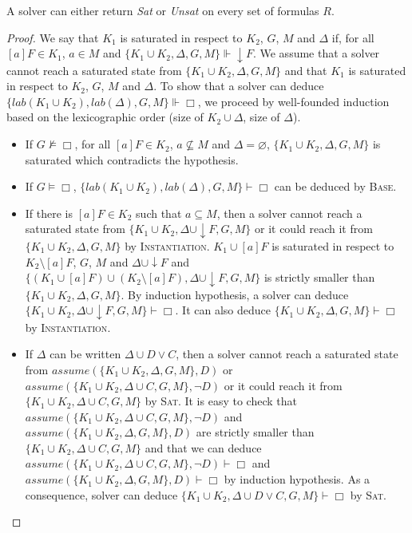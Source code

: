 \documentclass[a4paper,11pt]{article}
\newcommand{\T}{\mathit{lab}}
\newcommand{\A}{\mathit{assume}}
\begin{document}
{\theorem\label{comp} A solver can either return \emph{Sat} or \emph{Unsat} on every set of formulas $R$.}
\begin{proof}
We say that $K_1$ is saturated in respect to $K_2$, $G$, $M$ and $\Delta$ if, for all $[a]F\in K_1$,
$a\in M$ and $\{K_1\cup K_2,\Delta,G,M\}\Vdash\downarrow F$.
We assume that a solver cannot reach a saturated state from
$\{K_1\cup K_2,\Delta,G,M\}$ and that $K_1$ is saturated in respect to $K_2$, $G$, $M$ and $\Delta$.
To show that a solver can deduce $\{\T(K_1\cup K_2),\T(\Delta),G,M\}\Vdash\Box$,
we proceed by well-founded induction based on the lexicographic order (size of $K_2\cup \Delta$,
size of $\Delta$).
\begin{itemize}
 \item If $G\nvDash\Box$, for all $[a]F\in K_2$, $a\nsubseteq M$ and $\Delta=\varnothing$,
$\{K_1\cup K_2,\Delta,G,M\}$ is saturated which contradicts the hypothesis.
 \item If $G\vDash\Box$, $\{\T(K_1\cup K_2),\T(\Delta),G,M\}\vdash\Box$ can be deduced by \textsc{Base}.
 \item If there is $[a]F\in K_2$ such that $a\subseteq M$, then a solver
cannot reach a saturated state from $\{K_1\cup K_2,\Delta\cup\downarrow F,G,M\}$ or it could
reach it from $\{K_1\cup K_2,\Delta,G,M\}$ by \textsc{Instantiation}.
$K_1\cup [a]F$ is saturated in respect to $K_2\setminus[a]F$, $G$, $M$ and $\Delta\cup\downarrow F$
and $\{(K_1\cup [a]F)\cup(K_2\setminus[a]F),\Delta\cup\downarrow F,G,M\}$ is strictly smaller than
$\{K_1\cup K_2,\Delta,G,M\}$. By induction hypothesis,
a solver can deduce $\{K_1\cup K_2,\Delta\cup\downarrow F,G,M\}\vdash\Box$.
It can also deduce $\{K_1\cup K_2,\Delta,G,M\}\vdash\Box$ by \textsc{Instantiation}.
 \item If $\Delta$ can be written $\Delta\cup D\vee C$, then a solver
cannot reach a saturated state from $\A(\{K_1\cup K_2,\Delta,G,M\},D)$ or
$\A(\{K_1\cup K_2,\Delta\cup C,G,M\},\neg D)$ or it could
reach it from $\{K_1\cup K_2,\Delta\cup C,G,M\}$ by \textsc{Sat}.
It is easy to check that $\A(\{K_1\cup K_2,\Delta\cup C,G,M\},\neg D)$ and
$\A(\{K_1\cup K_2,\Delta,G,M\},D)$ are strictly smaller than $\{K_1\cup K_2,\Delta\cup C,G,M\}$
and that we can deduce $\A(\{K_1\cup K_2,\Delta\cup C,G,M\},\neg D)\vdash\Box$ and
$\A(\{K_1\cup K_2,\Delta,G,M\},D)\vdash\Box$ by induction hypothesis.
As a consequence, solver can deduce $\{K_1\cup K_2,\Delta\cup D\vee C,G,M\}\vdash\Box$ by \textsc{Sat}.
\end{itemize}
\end{proof}
\end{document}
